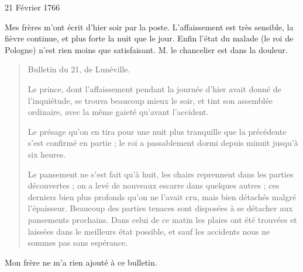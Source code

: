                      \begin{diary}{21 Février 1766}{}


                           Mes
                              frères m'ont écrit d'hier
                              soir par la
                           poste. L'affaissement est très sensible, la
                           fièvre continue, et plus forte la nuit que le
                           jour. Enfin l'état du malade (le roi de Pologne)
                           n'est rien moins que satisfaisant. M. le
                              chancelier
                           est dans la douleur. \bigskip


                        \begin{quote}\begin{flushright}Bulletin du 21, de
                                 Lunéville.\end{flushright}
                              Le prince, dont
                              l'affaissement pendant la journée
                              d'hier avait donné de l'inquiétude, se trouva beaucoup
                              mieux le soir, et tint son assemblée ordinaire, avec
                              la même gaieté qu'avant l'accident. \bigskip

         Le présage qu'on en tira pour une
                              nuit plus
                              tranquille que la précédente s'est confirmé en
                              partie ; le
                                    roi a passablement dormi depuis
                                    minuit jusqu'à six heures. \bigskip


                              Le pansement ne s'est fait qu'à huit, les chairs
                                 reprennent dans les parties découvertes ; on a levé
                                 de nouveaux escarre dans quelques autres ; ces
                                 derniers bien plus profonds qu'on ne l'avait cru,
                                 mais bien détachés malgré l'épaisseur. Beaucoup
                              des parties tenaces sont disposées à se détacher
                              aux pansements prochains. Dans celui de
                              ce matin les plaies ont été trouvées et
                              laissées dans le meilleurs état possible, et
                              sauf les accidents nous ne sommes pas
                              sans espérance. \bigskip

        \end{quote}

                           Mon frère ne m'a rien ajouté à ce
                           bulletin. \bigskip


                     \end{diary}


